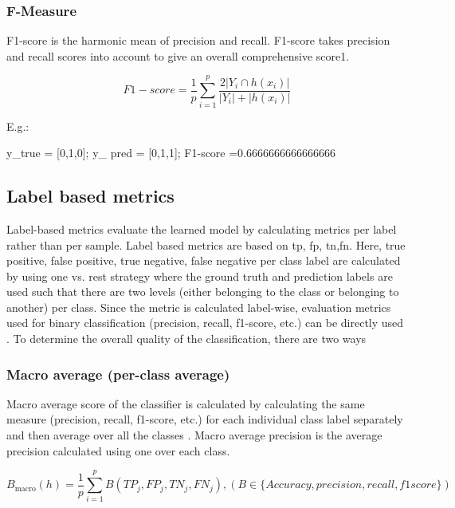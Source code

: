 \subsubsection{F-Measure}
F1-score is the harmonic mean of precision and recall. F1-score takes precision and recall scores into account to give an overall comprehensive score1\cite{sorower2010literature}.

$$F1-score = \frac{1}{p}\sum_{i =1}^{p}\frac{2|Y_i \cap h(x_i)|}{|Y_i| + |h(x_i)|}$$ \cite{zhang2010multi}

E.g.: 

y\_true = [0,1,0]; 
y\_ pred = [0,1,1]; 
F1-score =0.6666666666666666

\subsection{Label based metrics}
Label-based metrics evaluate the learned model by calculating metrics per label rather than per sample\cite{zhang2013review}. Label based metrics are based on \acrfull{tp}, \acrfull{fp}, \acrfull{tn},\acrfull{fn}. Here, true positive, false positive, true negative, false negative per class label are calculated by using one vs. rest strategy where the ground truth and prediction labels are used such that there are two levels (either belonging to the class or belonging to another) per class. Since the metric is calculated label-wise, evaluation metrics used for binary classification (precision, recall, f1-score, etc.)  can be directly used \cite{sorower2010literature}.  To determine the overall quality of the classification, there are two ways 
    
\subsubsection{Macro average (per-class average)}
Macro average score of the classifier is calculated by calculating the same measure (precision, recall, f1-score, etc.) for each individual class label separately and then average over all the classes \cite{sorower2010literature}. Macro average precision is the average precision calculated using one over each class. 

$$B_\mathrm{macro}(h) = \frac{1}{p}\sum_{i =1}^{p}B(TP_j,FP_j,TN_j,FN_j), (B\in \{Accuracy,precision,recall,f1score\})$$ \cite{zhang2010multi}

